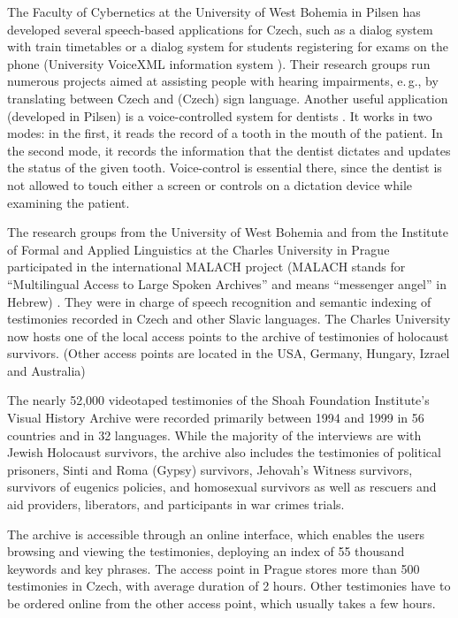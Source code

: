 \begin{multicols}{2}
The Faculty of Cybernetics at the University of West Bohemia in Pilsen has developed several speech-based applications for Czech, such as a dialog system with train timetables or a dialog system for students registering for exams on the phone (University VoiceXML information system \cite{Note24}). Their research groups run numerous projects aimed at assisting people with hearing impairments, e.\,g., by translating between Czech and (Czech) sign language.
Another useful application (developed in Pilsen) is a voice-controlled system for dentists \cite{Nagy2008}. It works in two modes:  in the first, it reads the record of a tooth in the mouth of the patient. In the second mode, it records the information that the dentist dictates and updates the status of the given tooth. Voice-control is essential there, since the dentist is not allowed to touch either a screen or controls on a dictation device while examining the patient.

The research groups from the University of West Bohemia and from the Institute of Formal and Applied Linguistics at the Charles University in Prague participated in the international MALACH project (MALACH stands for “Multilingual Access to Large Spoken Archives” and means “messenger angel” in Hebrew) \cite{Psutka2005}. They were in charge of speech recognition and semantic indexing of testimonies recorded in Czech and other Slavic languages. The Charles University now hosts one of the local access points to the archive of testimonies of holocaust survivors. (Other access points are located in the USA, Germany, Hungary, Izrael and Australia)

The nearly 52,000 videotaped testimonies of the Shoah Foundation Institute's Visual History Archive were recorded primarily between 1994 and 1999 in 56 countries and in 32 languages. While the majority of the interviews are with Jewish Holocaust survivors, the archive also includes the testimonies of political prisoners, Sinti and Roma (Gypsy) survivors, Jehovah's Witness survivors, survivors of eugenics policies, and homosexual survivors as well as rescuers and aid providers, liberators, and participants in war crimes trials.

The archive is accessible through an online interface, which enables the users browsing and viewing the testimonies, deploying an index of 55 thousand keywords and key phrases. The access point in Prague stores more than 500 testimonies in Czech, with average duration of 2 hours. Other testimonies have to be ordered online from the other access point, which usually takes a few hours.


\end{multicols}
